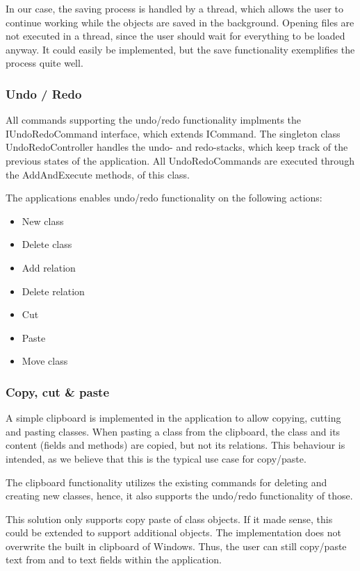In our case, the saving process is handled by a thread, which allows the user to
continue working while the objects are saved in the background. Opening files
are not executed in a thread, since the user should wait for everything to be
loaded anyway. It could easily be implemented, but the save functionality
exemplifies the process quite well.


\subsubsection{Undo / Redo}
All commands supporting the undo/redo functionality implments the
IUndoRedoCommand interface, which extends ICommand. The singleton class
UndoRedoController handles the undo- and redo-stacks, which keep track of the
previous states of the application. All UndoRedoCommands are executed through
the AddAndExecute methods, of this class.

The applications enables undo/redo functionality on the following actions:


\begin{itemize}
	\item New class
	\item Delete class
	\item Add relation
	\item Delete relation
	\item Cut
	\item Paste
	\item Move class
\end{itemize}


\subsubsection{Copy, cut \& paste}

A simple clipboard is implemented in the
application to allow copying, cutting and pasting classes. When pasting a class
from the clipboard, the class and its content (fields and methods) are copied,
but not its relations. This behaviour is intended, as we believe that this is
the typical use case for copy/paste.

The clipboard functionality utilizes the existing commands for deleting and
creating new classes, hence, it also supports the undo/redo functionality of
those.

This solution only supports copy paste of class objects. If it made sense, this 
could be extended to support additional objects. The implementation does not 
overwrite the built in clipboard of Windows. Thus, the user can still 
copy/paste text from and to text fields within the application.

